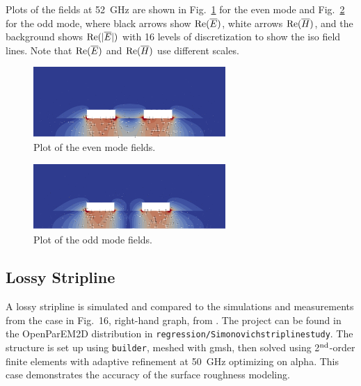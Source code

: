 \documentclass[titlepage]{article}
\renewcommand\_{\textunderscore\linebreak[1]}
\begin{document}
Plots of the fields at 52~GHz are shown in Fig.~\ref{fig:diffpair_even_plot} for the even mode and Fig.~\ref{fig:diffpair_odd_plot} for the odd mode, where black arrows show $\textnormal{Re}(\overline{E})$, white arrows $\textnormal{Re}(\overline{H})$, and the background shows $\textnormal{Re}(|\overline{E}|)$ with 16 levels of discretization to show the iso field lines.  Note that $\textnormal{Re}(\overline{E})$ and $\textnormal{Re}(\overline{H})$ use different scales.
\begin{figure}[H]
  \centering
  \includegraphics[width=0.65\textwidth]{../regression/OpenParEM2D/differential_pair/diff_pair_study/screenshots/diffpair_even_plot}
  \caption{Plot of the even mode fields.}
  \label{fig:diffpair_even_plot}
\end{figure}
\begin{figure}[H]
  \centering
  \includegraphics[width=0.65\textwidth]{../regression/OpenParEM2D/differential_pair/diff_pair_study/screenshots/diffpair_odd_plot}
  \caption{Plot of the odd mode fields.}
  \label{fig:diffpair_odd_plot}
\end{figure}

\subsection{Lossy Stripline}

A lossy stripline is simulated and compared to the simulations and measurements from the case in Fig.~16, right-hand graph, from \cite{Simonovich}.  The project can be found in the OpenParEM2D distribution in \texttt{regression/Simonovich\_stripline\_study}.  The structure is set up using \texttt{builder}, meshed with gmsh, then solved using 2$^{\textnormal{nd}}$-order finite elements with adaptive refinement at 50~GHz optimizing on alpha.  This case demonstrates the accuracy of the surface roughness modeling.
\end{document}
